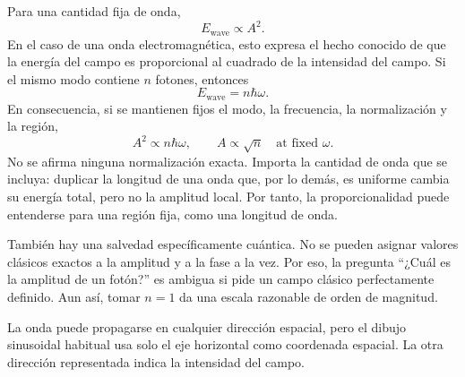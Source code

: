 Para una cantidad fija de onda,
\begin{equation}
E_{\text{wave}}\propto A^2.
\end{equation}
En el caso de una onda electromagnética, esto expresa el hecho conocido de que la energía del campo es proporcional al cuadrado de la intensidad del campo. Si el mismo modo contiene \(n\) fotones, entonces
\begin{equation}
E_{\text{wave}}=n\hbar\omega.
\end{equation}
En consecuencia, si se mantienen fijos el modo, la frecuencia, la normalización y la región,
\begin{equation}
A^2\propto n\hbar\omega,
\qquad
A\propto\sqrt n\quad\text{at fixed }\omega.
\end{equation}
No se afirma ninguna normalización exacta. Importa la cantidad de onda que se incluya: duplicar la longitud de una onda que, por lo demás, es uniforme cambia su energía total, pero no la amplitud local. Por tanto, la proporcionalidad puede entenderse para una región fija, como una longitud de onda.

También hay una salvedad específicamente cuántica. No se pueden asignar valores clásicos exactos a la amplitud y a la fase a la vez. Por eso, la pregunta ``¿Cuál es la amplitud de un fotón?'' es ambigua si pide un campo clásico perfectamente definido. Aun así, tomar \(n=1\) da una escala razonable de orden de magnitud.

\begin{classroomqa}
\end{classroomqa}

La onda puede propagarse en cualquier dirección espacial, pero el dibujo sinusoidal habitual usa solo el eje horizontal como coordenada espacial. La otra dirección representada indica la intensidad del campo.

\begin{classroomqa}
\end{classroomqa}

